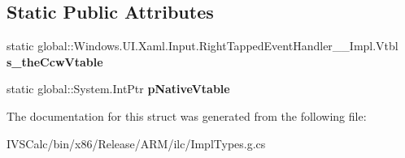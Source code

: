 \subsection*{Static Public Attributes}
\begin{DoxyCompactItemize}
\item 
\mbox{\label{struct_windows_1_1_u_i_1_1_xaml_1_1_input_1_1_right_tapped_event_handler_____impl_1_1_vtbl_ac158920f7a9696a4d57ade7ce01ef83e}} 
static global\+::\+Windows.\+U\+I.\+Xaml.\+Input.\+Right\+Tapped\+Event\+Handler\+\_\+\+\_\+\+Impl.\+Vtbl {\bfseries s\+\_\+the\+Ccw\+Vtable}
\item 
\mbox{\label{struct_windows_1_1_u_i_1_1_xaml_1_1_input_1_1_right_tapped_event_handler_____impl_1_1_vtbl_ab46f782251ff5c8904ffd71ac9d27382}} 
static global\+::\+System.\+Int\+Ptr {\bfseries p\+Native\+Vtable}
\end{DoxyCompactItemize}


The documentation for this struct was generated from the following file\+:\begin{DoxyCompactItemize}
\item 
I\+V\+S\+Calc/bin/x86/\+Release/\+A\+R\+M/ilc/Impl\+Types.\+g.\+cs\end{DoxyCompactItemize}
